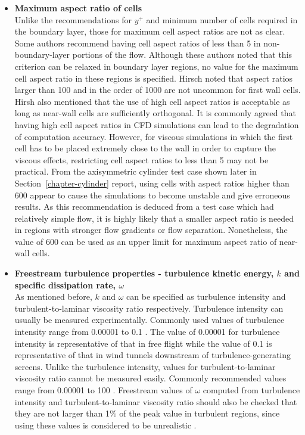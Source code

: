\begin{itemize}
\item \textbf{Maximum aspect ratio of cells} \\
Unlike the recommendations for $y^+$ and minimum number of cells required in the
boundary layer, those for maximum cell aspect ratios are not as clear. Some authors
\cite{Tu2008,Fluent2006} recommend having cell aspect ratios of less than 5 in
non-boundary-layer portions of the flow. Although these authors noted that this criterion can
be relaxed in boundary layer regions, no value for the maximum cell aspect ratio in these regions is specified.
Hirsch \cite{Hirsch1988,Hirsch2007} noted that aspect ratios larger than 100 and in the order of
1000 are not uncommon for first wall cells. Hirsh also mentioned that the use of high cell aspect
ratios is acceptable as long as near-wall cells are sufficiently orthogonal. 
It is commonly agreed that having high cell aspect ratios in CFD simulations can lead to the
degradation of computation accuracy. However, for viscous simulations in which the first cell
has to be placed extremely close to the wall in order to capture the viscous effects,
restricting cell aspect ratios to less than 5 may not be practical. From the axisymmetric
cylinder test case shown later in Section~\ref{chapter-cylinder} report, using cells with 
aspect ratios higher than 600 appear to cause the simulations to become unstable and give 
erroneous results. As this recommendation is deduced from a test case which had relatively 
simple flow, it is highly likely that a smaller aspect ratio is needed in regions with 
stronger flow gradients or flow separation. Nonetheless, the value of 600 can be used as 
an upper limit for maximum aspect ratio of near-wall cells.

\item \textbf{Freestream turbulence properties - turbulence kinetic energy, $k$ 
and specific dissipation rate, $\omega$} \\
As mentioned before, $k$ and $\omega$ can be specified as turbulence intensity
and turbulent-to-laminar viscosity ratio respectively. 
Turbulence intensity can usually be measured experimentally. Commonly used values of 
turbulence intensity range from 0.00001 to 0.1 \cite{Roy2003,Fluent2006}. The value of 
0.00001 for turbulence intensity is representative of that in free flight while the value 
of 0.1 is representative of that in wind tunnels downstream of turbulence-generating screens.
Unlike the turbulence intensity, values for turbulent-to-laminar viscosity ratio cannot
be measured easily. Commonly recommended values range from 0.00001 to 100 \cite{Roy2003,Fluent2006,
ESI2004,Tu2008}. Freestream values of $\omega$ computed from turbulence intensity and
turbulent-to-laminar viscosity ratio should also be checked that they are not larger
than 1\% of the peak value in turbulent regions, since using these values is considered
to be unrealistic \cite{Wilcox2006}.

\end{itemize}

